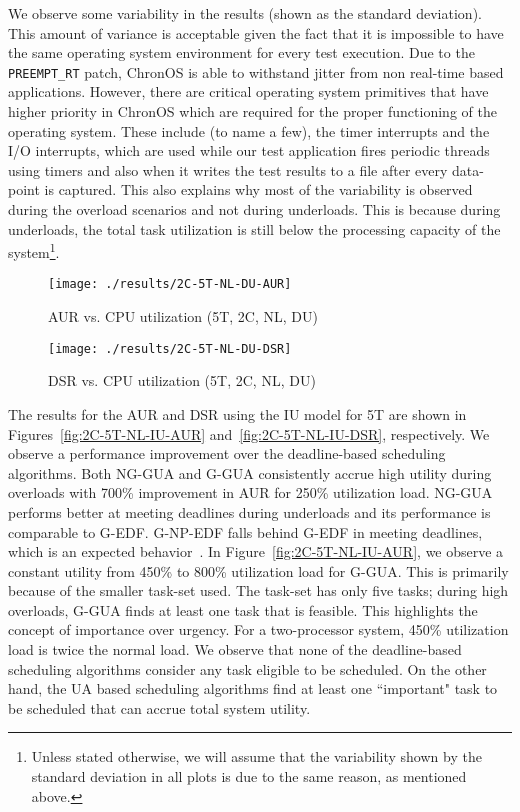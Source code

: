 \documentclass[12pt,dvips]{report}
\begin{document}
We observe some variability in the results (shown as the standard deviation). This amount of variance is acceptable given the fact that it is impossible to have the same operating system environment for every test execution. Due to the \texttt{PREEMPT\_RT} patch, ChronOS is able to withstand jitter from non real-time based applications. However, there are critical operating system primitives that have higher priority in ChronOS which are required for the proper functioning of the operating system. These include (to name a few), the timer interrupts and the I/O interrupts, which are used while our test application fires periodic threads using timers and also when it writes the test results to a file after every data-point is captured. This also explains why most of the variability is observed during the overload scenarios and not during underloads. This is because during underloads, the total task utilization is still below the processing capacity of the system\footnote{Unless stated otherwise, we will assume that the variability shown by the standard deviation in all plots is due to the same reason, as mentioned above.}.

\begin{figure} [htbp]
  \centering
  \texttt{[image: ./results/2C-5T-NL-DU-AUR]}
  \caption{AUR vs. CPU utilization (5T, 2C, NL, DU)}
  \label{fig:2C-5T-NL-DU-AUR}
\end{figure}


\begin{figure} [htbp]
  \centering
  \texttt{[image: ./results/2C-5T-NL-DU-DSR]}
  \caption{DSR vs. CPU utilization (5T, 2C, NL, DU)}
  \label{fig:2C-5T-NL-DU-DSR}
\end{figure}
 
The results for the AUR and DSR using the IU model for 5T are shown in Figures~\ref{fig:2C-5T-NL-IU-AUR} and~\ref{fig:2C-5T-NL-IU-DSR}, respectively. We observe a performance improvement over the deadline-based scheduling algorithms. Both NG-GUA and G-GUA consistently accrue high utility during overloads with 700\% improvement in AUR for 250\% utilization load. NG-GUA performs better at meeting deadlines during underloads and its performance is comparable to G-EDF. G-NP-EDF falls behind G-EDF in meeting deadlines, which is an expected behavior~\cite{Baruah-gnpedf}. In Figure~\ref{fig:2C-5T-NL-IU-AUR}, we observe a constant utility from 450\% to 800\% utilization load for G-GUA. This is primarily because of the smaller task-set used. The task-set has only five tasks; during high overloads, G-GUA finds at least one task that is feasible. This highlights the concept of importance over urgency. For a two-processor system, 450\% utilization load is twice the normal load. We observe that none of the deadline-based scheduling algorithms consider any task eligible to be scheduled. On the other hand, the UA based scheduling algorithms find at least one ``important" task to be scheduled that can accrue total system utility.
\end{document}
